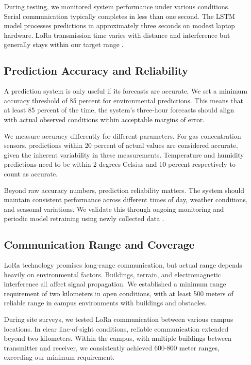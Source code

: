During testing, we monitored system performance under various conditions. Serial communication typically completes in less than one second. The LSTM model processes predictions in approximately three seconds on modest laptop hardware. LoRa transmission time varies with distance and interference but generally stays within our target range \cite{augustin2016study}.

\subsection{Prediction Accuracy and Reliability}

A prediction system is only useful if its forecasts are accurate. We set a minimum accuracy threshold of 85 percent for environmental predictions. This means that at least 85 percent of the time, the system's three-hour forecasts should align with actual observed conditions within acceptable margins of error.

We measure accuracy differently for different parameters. For gas concentration sensors, predictions within 20 percent of actual values are considered accurate, given the inherent variability in these measurements. Temperature and humidity predictions need to be within 2 degrees Celsius and 10 percent respectively to count as accurate.

Beyond raw accuracy numbers, prediction reliability matters. The system should maintain consistent performance across different times of day, weather conditions, and seasonal variations. We validate this through ongoing monitoring and periodic model retraining using newly collected data \cite{dietterich2000ensemble}.

\subsection{Communication Range and Coverage}

LoRa technology promises long-range communication, but actual range depends heavily on environmental factors. Buildings, terrain, and electromagnetic interference all affect signal propagation. We established a minimum range requirement of two kilometers in open conditions, with at least 500 meters of reliable range in campus environments with buildings and obstacles.

During site surveys, we tested LoRa communication between various campus locations. In clear line-of-sight conditions, reliable communication extended beyond two kilometers. Within the campus, with multiple buildings between transmitter and receiver, we consistently achieved 600-800 meter ranges, exceeding our minimum requirement.

